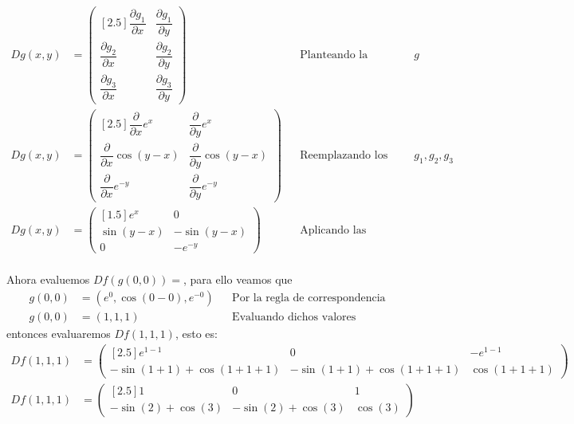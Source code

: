 \documentclass[letterpaper]{article}
\renewcommand{\d}{\partial}
\renewcommand{\*}{\cdot}
\theoremstyle{definition}
\begin{document}
\begin{align*}
	Dg(x,y) &= \begin{pmatrix}[2.5]
	\dfrac{\d g_1}{\d x} & \dfrac{\d g_1}{\d y} \\
	\dfrac{\d g_2}{\d x} & \dfrac{\d g_2}{\d y} \\
	\dfrac{\d g_3}{\d x} & \dfrac{\d g_3}{\d y} 
	\end{pmatrix} &&\text{Planteando la jacobiana de la función }g \\
	Dg(x,y) &= \begin{pmatrix}[2.5]
	\dfrac{\d }{\d x} e^x & \dfrac{\d}{\d y} e^x \\
	\dfrac{\d }{\d x}\cos{(y - x)}  & \dfrac{\d}{\d y} \cos{(y - x)}\\
	\dfrac{\d }{\d x}e^{-y}  & \dfrac{\d}{\d y} e^{-y}
	\end{pmatrix} &&\text{Reemplazando los valores de }g_1,g_2,g_3 \\
	Dg(x,y) &= \begin{pmatrix}[1.5]
	e^x & 0\\
	\sin{(y - x)}  & -\sin{(y - x)}\\
	0 & -e^{-y}
	\end{pmatrix}&&\text{Aplicando las derivadas parciales } \\
\end{align*}

Ahora evaluemos $ Df(g(0,0)) =  $, para ello veamos que 
\begin{align*}
	g(0,0) &= (e^{0}, \cos{(0 - 0)}, e^{-0} ) && \text{Por la regla de correspondencia}\\
	g(0,0) &= (1, 1, 1 ) && \text{Evaluando dichos valores }
\end{align*}
entonces evaluaremos $ Df(1,1,1) $, esto es:
\begin{align*}
	Df(1,1,1) &= \begin{pmatrix}[2.5]
	e^{1 -1} & 0& -e^{1 -1} \\
	-\sin(1 + 1) + \cos(1 + 1 + 1) & -\sin(1 + 1) + \cos(1 + 1 + 1) & \cos(1 + 1 + 1)
	\end{pmatrix}\\
	Df(1,1,1) &= \begin{pmatrix}[2.5]
	1 & 0& 1 \\
	-\sin(2) + \cos(3) & -\sin(2) + \cos(3) & \cos(3)
	\end{pmatrix}\\
\end{align*}
\end{document}
